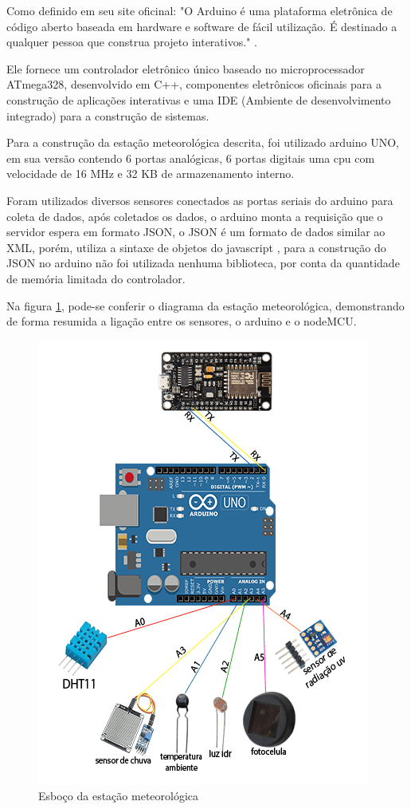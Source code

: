 Como definido em seu site oficinal: "O Arduino é uma plataforma eletrônica de código aberto baseada em hardware e software de fácil utilização. É destinado a qualquer pessoa que construa projeto interativos." \cite{arduino_about}.

Ele fornece um controlador eletrônico único baseado no microprocessador ATmega328, desenvolvido em C++, componentes eletrônicos oficinais para a construção de aplicações interativas e uma IDE (Ambiente de desenvolvimento integrado) para a construção de sistemas.

Para a construção da estação meteorológica descrita, foi utilizado arduino UNO, em sua versão contendo 6 portas analógicas, 6 portas digitais uma cpu com velocidade de 16 MHz e 32 KB de armazenamento interno.

Foram utilizados diversos sensores conectados as portas seriais do arduino para coleta de dados, após coletados os dados, o arduino monta a requisição que o servidor espera em formato JSON, o JSON é um formato de dados similar ao XML, porém, utiliza a sintaxe de objetos do javascript \cite{json_doc}, para a construção do JSON no arduino não foi utilizada nenhuma biblioteca, por conta da quantidade de memória limitada do controlador.

Na figura \ref{fig:arduino_diagram}, pode-se conferir o diagrama da estação meteorológica, demonstrando de forma resumida a ligação entre os sensores, o arduino e o nodeMCU.

\begin{figure}[H]
    \centering
    \caption{Esboço da estação meteorológica \label{fig:arduino_diagram}}
    \includegraphics[scale=0.8]{diagrams/arduino.png}
    \hfill
{}
\end{figure}

